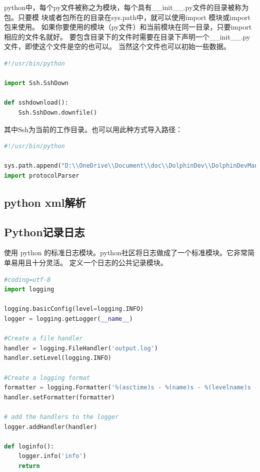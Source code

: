 \documentclass{book}
\begin{document}
python中，每个py文件被称之为模块，每个具有\_\_init\_\_.py文件的目录被称为包。只要模
块或者包所在的目录在sys.path中，就可以使用import 模块或import 包来使用。
如果你要使用的模块（py文件）和当前模块在同一目录，只要import相应的文件名就好。
要包含目录下的文件时需要在目录下声明一个\_\_init\_\_.py文件，即使这个文件是空的也可以。
当然这个文件也可以初始一些数据。

\begin{lstlisting}[language=Python]
#!/usr/bin/python

import Ssh.SshDown

def sshdownload():
	Ssh.SshDown.downfile()
\end{lstlisting}

其中Ssh为当前的工作目录。也可以用此种方式导入路径：

\begin{lstlisting}[language=Python]
#!/usr/bin/python

sys.path.append("D:\\OneDrive\\Document\\doc\\DolphinDev\\DolphinDevManual\\Scripts\\Python\\Source\\Python\\UI\\Widgets")
import protocolParser
\end{lstlisting}

\subsection{python xml解析}

\subsection{Python记录日志}

使用 python 的标准日志模块。python社区将日志做成了一个标准模块。它非常简单易用且十分灵活。
定义一个日志的公共记录模块。

\begin{lstlisting}[language=Python]
#coding=utf-8
import logging

logging.basicConfig(level=logging.INFO)
logger = logging.getLogger(__name__)

#Create a file handler
handler = logging.FileHandler('output.log')
handler.setLevel(logging.INFO)

#Create a logging format
formatter = logging.Formatter('%(asctime)s - %(name)s - %(levelname)s - %(message)s')
handler.setFormatter(formatter)

# add the handlers to the logger
logger.addHandler(handler)

def loginfo():
    logger.info('info')
    return
\end{lstlisting}
\end{document}
